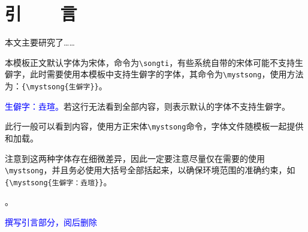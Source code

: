 
\chapter{引~~~~言}
本文主要研究了……

本模板正文默认字体为宋体，命令为\verb|\songti|，有些系统自带的宋体可能不支持生僻字，此时需要使用本模板中支持生僻字的字体{}，其命令为\verb|\mystsong|，使用方法为：\verb|{\mystsong{生僻字}}|。

\textcolor{blue}{生僻字：垚瑄。}若这行无法看到全部内容，则表示默认的字体不支持生僻字。

\textcolor{blue}{}此行一般可以看到内容，使用方正宋体\verb|\mystsong|命令，字体文件随模板一起提供和加载。

注意到这两种字体存在细微差异，因此一定要注意尽量仅在需要的使用\verb|\mystsong|，并且务必使用大括号全部括起来，以确保环境范围的准确约束，如\verb|{\mystsong{生僻字：垚瑄}}|。

{}。


\textcolor{blue}{撰写引言部分，阅后删除}